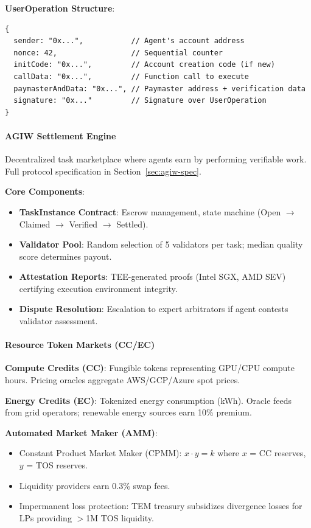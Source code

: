 \documentclass[11pt]{article}
\begin{document}
\textbf{UserOperation Structure}:
\begin{verbatim}
{
  sender: "0x...",           // Agent's account address
  nonce: 42,                 // Sequential counter
  initCode: "0x...",         // Account creation code (if new)
  callData: "0x...",         // Function call to execute
  paymasterAndData: "0x...", // Paymaster address + verification data
  signature: "0x..."         // Signature over UserOperation
}
\end{verbatim}

\paragraph{AGIW Settlement Engine}
Decentralized task marketplace where agents earn by performing verifiable work. Full protocol specification in Section~\ref{sec:agiw-spec}.

\textbf{Core Components}:
\begin{itemize}[noitemsep]
  \item \textbf{TaskInstance Contract}: Escrow management, state machine (Open $\to$ Claimed $\to$ Verified $\to$ Settled).
  \item \textbf{Validator Pool}: Random selection of 5 validators per task; median quality score determines payout.
  \item \textbf{Attestation Reports}: TEE-generated proofs (Intel SGX, AMD SEV) certifying execution environment integrity.
  \item \textbf{Dispute Resolution}: Escalation to expert arbitrators if agent contests validator assessment.
\end{itemize}

\paragraph{Resource Token Markets (CC/EC)}
\textbf{Compute Credits (CC)}: Fungible tokens representing GPU/CPU compute hours. Pricing oracles aggregate AWS/GCP/Azure spot prices.

\textbf{Energy Credits (EC)}: Tokenized energy consumption (kWh). Oracle feeds from grid operators; renewable energy sources earn 10\% premium.

\textbf{Automated Market Maker (AMM)}:
\begin{itemize}[noitemsep]
  \item Constant Product Market Maker (CPMM): $x \cdot y = k$ where $x$ = CC reserves, $y$ = TOS reserves.
  \item Liquidity providers earn 0.3\% swap fees.
  \item Impermanent loss protection: TEM treasury subsidizes divergence losses for LPs providing $>$1M TOS liquidity.
\end{itemize}
\end{document}
